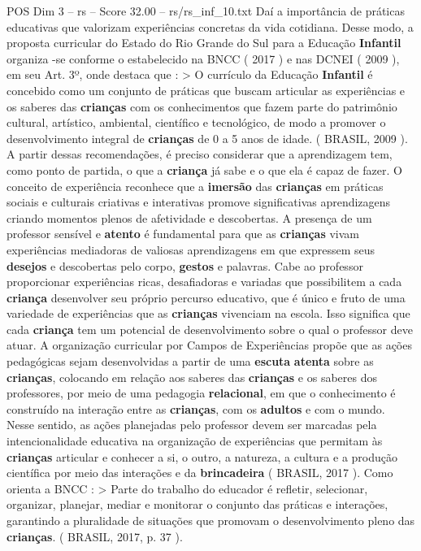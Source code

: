 \begin{textsample}{POS Dim 3 – rs – Score 32.00 – rs/rs\_inf\_10.txt}
Daí a importância de práticas educativas que valorizam experiências concretas da vida cotidiana.
Desse modo, a proposta curricular do Estado do Rio Grande do Sul para a Educação \textbf{Infantil} organiza -se conforme o estabelecido na BNCC ( 2017 ) e nas DCNEI ( 2009 ), em seu Art. 3º, onde destaca que : > O currículo da Educação \textbf{Infantil} é concebido como um conjunto de práticas que buscam articular as experiências e os saberes das \textbf{crianças} com os conhecimentos que fazem parte do patrimônio cultural, artístico, ambiental, científico e tecnológico, de modo a promover o desenvolvimento integral de \textbf{crianças} de 0 a 5 anos de idade. ( BRASIL, 2009 ).
A partir dessas recomendações, é preciso considerar que a aprendizagem tem, como ponto de partida, o que a \textbf{criança} já sabe e o que ela é capaz de fazer.
O conceito de experiência reconhece que a \textbf{imersão} das \textbf{crianças} em práticas sociais e culturais criativas e interativas promove significativas aprendizagens criando momentos plenos de afetividade e descobertas.
A presença de um professor sensível e \textbf{atento} é fundamental para que as \textbf{crianças} vivam experiências mediadoras de valiosas aprendizagens em que expressem seus \textbf{desejos} e descobertas pelo corpo, \textbf{gestos} e palavras.
Cabe ao professor proporcionar experiências ricas, desafiadoras e variadas que possibilitem a cada \textbf{criança} desenvolver seu próprio percurso educativo, que é único e fruto de uma variedade de experiências que as \textbf{crianças} vivenciam na escola.
Isso significa que cada \textbf{criança} tem um potencial de desenvolvimento sobre o qual o professor deve atuar.
A organização curricular por Campos de Experiências propõe que as ações pedagógicas sejam desenvolvidas a partir de uma \textbf{escuta} \textbf{atenta} sobre as \textbf{crianças}, colocando em relação aos saberes das \textbf{crianças} e os saberes dos professores, por meio de uma pedagogia \textbf{relacional}, em que o conhecimento é construído na interação entre as \textbf{crianças}, com os \textbf{adultos} e com o mundo.
Nesse sentido, as ações planejadas pelo professor devem ser marcadas pela intencionalidade educativa na organização de experiências que permitam às \textbf{crianças} articular e conhecer a si, o outro, a natureza, a cultura e a produção científica por meio das interações e da \textbf{brincadeira} ( BRASIL, 2017 ).
Como orienta a BNCC : > Parte do trabalho do educador é refletir, selecionar, organizar, planejar, mediar e monitorar o conjunto das práticas e interações, garantindo a pluralidade de situações que promovam o desenvolvimento pleno das \textbf{crianças}. ( BRASIL, 2017, p. 37 ).

\end{textsample}
